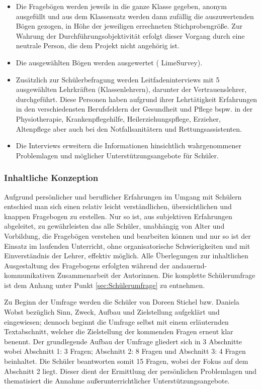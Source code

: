 \begin{itemize}
	\item Die Fragebögen werden jeweils in die ganze Klasse gegeben, anonym ausgefüllt und aus dem Klassensatz werden dann zufällig die auszuwertenden Bögen gezogen, in Höhe der jeweiligen errechneten Stichprobengröße. Zur Wahrung der Durchführungsobjektivität erfolgt dieser Vorgang durch eine neutrale Person, die dem Projekt nicht angehörig ist. 
	\item Die ausgewählten Bögen werden ausgewertet ( LimeSurvey).
	\item Zusätzlich zur Schülerbefragung werden Leitfadeninterviews mit 5 ausgewählten Lehrkräften (Klassenlehrern), darunter der Vertrauenslehrer, durchgeführt. Diese Personen haben aufgrund ihrer Lehrtätigkeit Erfahrungen in den verschiedensten Berufsfeldern der Gesundheit und Pflege bspw. in der Physiotherapie, Krankenpflegehilfe, Heilerziehungspflege, Erzieher, Altenpflege aber auch bei den Notfallsanitätern und Rettungsassistenten.
	\item Die Interviews erweitern die Informationen hinsichtlich wahrgenommener Problemlagen und möglicher Unterstützungsangebote für Schüler.
\end{itemize}

\subsubsection{Inhaltliche Konzeption}
\label{sec:InhaltlicheKonzeption}

Aufgrund persönlicher und beruflicher Erfahrungen im Umgang mit Schülern entschied man sich einen relativ leicht verständlichen, übersichtlichen und knappen Fragebogen zu erstellen. Nur so ist, aus subjektiven Erfahrungen abgeleitet, zu gewährleisten das alle Schüler, unabhängig von Alter und Vorbildung, die Fragebögen verstehen und bearbeiten können und nur so ist der Einsatz im laufenden Unterricht, ohne organisatorische Schwierigkeiten und mit Einverständnis der Lehrer, effektiv möglich. Alle Überlegungen zur inhaltlichen Ausgestaltung des Fragebogens erfolgten während der andauernd-kommunikativen Zusammenarbeit der Autorinnen. Die komplette Schülerumfrage ist dem Anhang unter Punkt \ref{sec:Schülerumfrage} zu entnehmen.

Zu Beginn der Umfrage werden die Schüler von Doreen Stichel bzw. Daniela Wobst bezüglich Sinn, Zweck, Aufbau und Zielstellung aufgeklärt und eingewiesen; dennoch beginnt die Umfrage selbst mit einem erläuternden Textabschnitt, welcher die Zielstellung der kommenden Fragen erneut klar benennt. Der grundlegende Aufbau der Umfrage gliedert sich in 3 Abschnitte wobei Abschnitt 1: 3 Fragen; Abschnitt 2: 8 Fragen und Abschnitt 3: 4 Fragen beinhaltet. Die Schüler beantworten somit 15 Fragen, wobei der Fokus auf dem Abschnitt 2 liegt. Dieser dient der Ermittlung der persönlichen Problemlagen und thematisiert die Annahme außerunterrichtlicher Unterstützungsangebote. 

